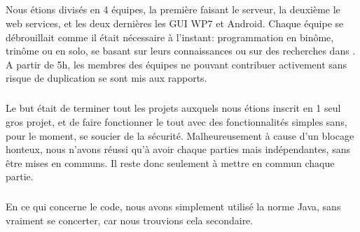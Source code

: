 \documentclass[a4paper,francais,titlepage]{article}
\begin{document}
\subparagraph{}Nous étions divisés en 4 équipes, la première faisant le serveur, la deuxième le web services, et les deux dernières les GUI WP7 et Android. Chaque équipe se débrouillait comme il était nécessaire à l'instant: programmation en binôme, trinôme ou en solo, se basant sur leurs connaissances ou sur des recherches dans . A partir de 5h, les membres des équipes ne pouvant contribuer activement sans risque de duplication se sont mis aux rapports.

\subparagraph{}Le but était de terminer tout les projets auxquels nous étions inscrit en 1 seul gros projet, et de faire fonctionner le tout avec des fonctionnalités simples sans, pour le moment, se soucier de la sécurité. Malheureusement à cause d'un blocage honteux, nous n'avons réussi qu'à avoir chaque parties mais indépendantes, sans être mises en communs. Il reste donc seulement à mettre en commun chaque partie.

\subparagraph{}En ce qui concerne le code, nous avons simplement utilisé la norme Java, sans vraiment se concerter, car nous trouvions cela secondaire.
\end{document}
